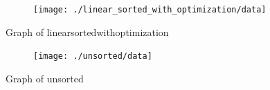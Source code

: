 \documentclass[a4paper,11pt]{article}
\begin{document}
    \begin{figure}[h]
        \centering
        \begin{subfigure}[b]{.5\textwidth}
            \centering
            \texttt{[image: ./linear\_sorted\_with\_optimization/data]} %
        \end{subfigure}
        \caption{Graph of linearsortedwithoptimization}
        \label{fig:graph_3}
    \end{figure}
    \begin{figure}[h]
        \centering
        \begin{subfigure}[b]{.5\textwidth}
            \centering
            \texttt{[image: ./unsorted/data]} %
        \end{subfigure}
        \caption{Graph of unsorted}
        \label{fig:graph_4}
    \end{figure}
\end{document}
